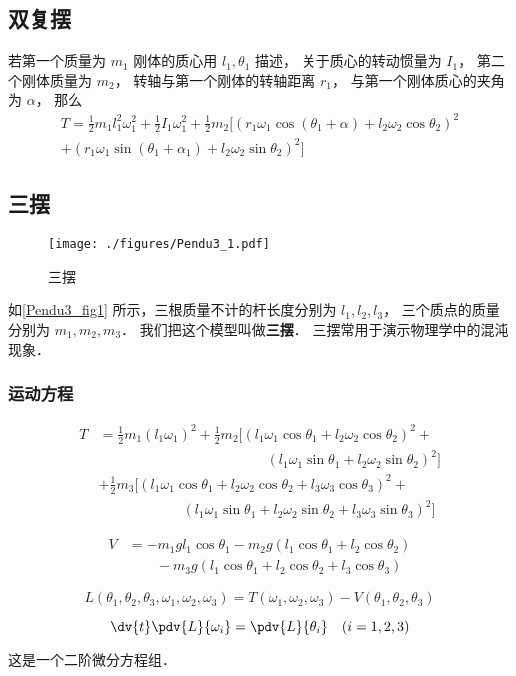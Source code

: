\subsection{双复摆}
若第一个质量为 $m_1$ 刚体的质心用 $l_1,\theta_1$ 描述， 关于质心的转动惯量为 $I_1$， 第二个刚体质量为 $m_2$， 转轴与第一个刚体的转轴距离 $r_1$， 与第一个刚体质心的夹角为 $\alpha$， 那么
\begin{equation}
\begin{aligned}
T = \frac{1}{2}m_1 l_1^2 \omega_1^2 + \frac{1}{2}I_1 \omega_1^2
 + \frac{1}{2}m_2[(r_1\omega_1\cos(\theta_1 + \alpha) + l_2\omega_2\cos\theta_2)^2\\
+ (r_1\omega_1\sin(\theta_1+\alpha_1) + l_2\omega_2\sin\theta_2)^2]
\end{aligned}
\end{equation}


\subsection{三摆}
\begin{figure}[ht]
\centering
\texttt{[image: ./figures/Pendu3\_1.pdf]}
\caption{三摆} \label{Pendu3_fig1}
\end{figure}
如\autoref{Pendu3_fig1} 所示，三根质量不计的杆长度分别为 $l_1, l_2, l_3$， 三个质点的质量分别为 $m_1, m_2, m_3$． 我们把这个模型叫做\textbf{三摆}． 三摆常用于演示物理学中的混沌现象．

\subsubsection{运动方程}
\begin{equation}
\begin{aligned}
T &= \frac{1}{2} m_1 (l_1 \omega_1)^2 + \frac{1}{2} m_2 [(l_1 \omega_1 \cos\theta_1 + l_2 \omega_2 \cos\theta_2)^2 +\\
&\qquad \qquad\qquad\qquad\qquad\qquad (l_1 \omega_1 \sin\theta_1 + l_2 \omega_2 \sin\theta_2)^2]\\
& + \frac{1}{2} m_3 [(l_1 \omega_1 \cos\theta_1 + l_2 \omega_2 \cos\theta_2 + l_3 \omega_3 \cos \theta_3)^2 +\\
&\qquad\qquad\qquad (l_1 \omega_1 \sin\theta_1 + l_2 \omega_2 \sin\theta_2 + l_3 \omega_3 \sin\theta_3)^2]
\end{aligned}
\end{equation}

\begin{equation} 
\begin{aligned} 
V &= -m_1 g l_1 \cos \theta_1 - m_2 g (l_1\cos \theta_1 + l_2 \cos \theta_2)\\
&\qquad - m_3 g (l_1 \cos\theta_1 + l_2 \cos \theta_2 + l_3 \cos \theta_3)
\end{aligned}
\end{equation}

\begin{equation}
L(\theta_1, \theta_2, \theta_3, \omega_1, \omega_2, \omega_3) = T(\omega_1, \omega_2, \omega_3) - V(\theta_1, \theta_2, \theta_3)
\end{equation}

\begin{equation}
\dv{t} \pdv{L}{\omega_i} = \pdv{L}{\theta_i} \quad (i=1,2,3)
\end{equation}

这是一个二阶微分方程组．


